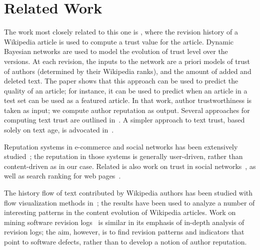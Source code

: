\section{Related Work}

The work most closely related to this one is \cite{Zeng2006}, where the
revision history of a Wikipedia article is used to compute a trust
value for the article.
Dynamic Bayesian networks are used to model the
evolution of trust level over the versions. 
At each revision, the inputs to the network are a priori models of
trust of authors (determined by their Wikipedia ranks), 
and the amount of added and deleted text. 
The paper shows that this approach can be used to predict the quality
of an article; for instance, it can be used to predict when an article
in a test set can be used as a featured article.  
In that work, author trustworthiness is
taken as input; we compute author reputation as output. 
Several approaches for computing text trust are outlined
in~\cite{WikiMTWtrust06}. 
A simpler approach to text trust, based solely on text age, is
advocated in~\cite{Cross2006}. 

Reputation systems in e-commerce and social networks has been extensively
studied~\cite{Resnick2000,Dellarocas2003,Kamvar2003,Farmer2010};
the reputation in those systems is generally user-driven, rather than
content-driven as in our case. 
Related is also work on trust in social networks~\cite{Guha2004,Golbeck2005},
as well as search ranking for web pages~\cite{Kleinberg1999,Page1999}.

The history flow of text contributed by Wikipedia authors has
been studied with flow visualization methods in~\cite{Viegas2004}; 
the results have been used to analyze a number of interesting patterns
in the content evolution of Wikipedia articles. 
Work on mining software revision logs~\cite{Livshits2005}
is similar in its emphasis of in-depth analysis of revision logs; the
aim, however, is to find revision patterns and indicators that point
to software defects, rather than to develop a notion of author
reputation. 

